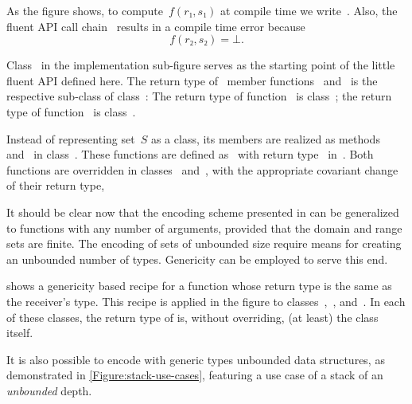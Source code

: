 As the figure shows, to compute~$f(r₁,s₁)$ at compile time we write~.
Also, the fluent API call chain~ results in a compile time
error because 
\[
    f(r₂, s₂)=⊥.
\]

Class~ in the implementation sub-figure serves as
  the starting point of the little fluent API defined here.
The return type of~ member functions~ and~
  is the respective sub-class of class~:
The return type of function~ is class~;
  the return type of function~ is class~.

Instead of representing set~$S$ as a class,
  its members are realized as methods~ and~ in class~.
These functions are defined as~ with return type~
  in~.
Both functions are overridden in classes~ and~,
   with the appropriate covariant change of their return type,

It should be clear now that the encoding scheme presented
in  can be generalized to functions
  with any number of arguments, provided that the domain and range sets are finite.
The encoding of sets of unbounded size require means for creating an unbounded
 number of types.
Genericity can be employed to serve this end.


 shows a genericity based recipe for
  a function whose return type
  is the same as the receiver's type.
  This recipe is applied in the figure to classes~,~, and~.
  In each of these classes, the return type of  is,
  without overriding, (at least) the class itself.

It is also possible to encode with \Java generic types
  unbounded data structures, 
  as demonstrated in \cref{Figure:stack-use-cases},
  featuring a use case of a stack of an \emph{unbounded} depth.
\vspace{2ex}

